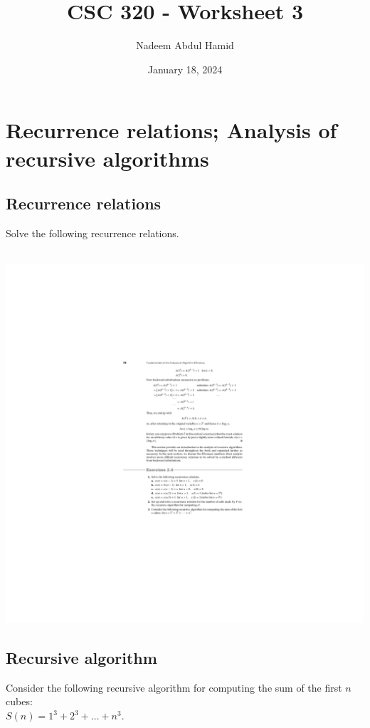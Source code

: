 \documentclass[12pt]{article}
\title{CSC 320 - Worksheet 3}
\author{Nadeem Abdul Hamid}
\date{January 18, 2024}
\begin{document}
\section{Recurrence relations; Analysis of recursive algorithms}

\subsection{Recurrence relations}

Solve the following recurrence relations.\\~

\includegraphics{w03-recs.pdf}


\clearpage
\subsection{Recursive algorithm}

Consider the following recursive algorithm for computing the sum of the first $n$ cubes:\\ $S(n) = 1^3 + 2^3 + \dots + n^3$.\\ ~
\end{document}
